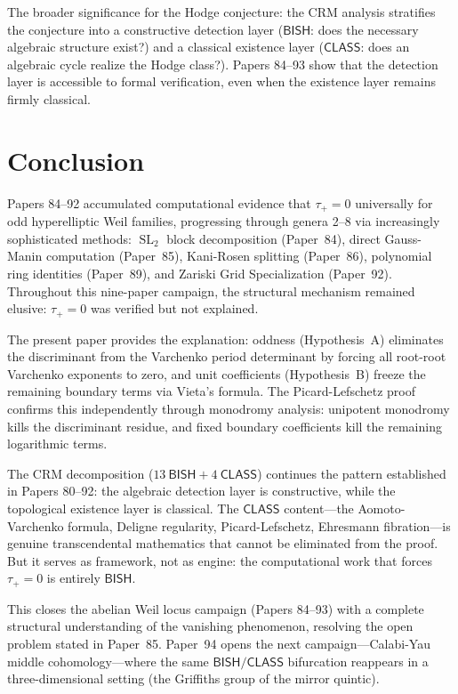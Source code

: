 \documentclass[11pt]{article}
\theoremstyle{plain}
\theoremstyle{definition}
\theoremstyle{remark}
\newcommand{\SL}{\operatorname{SL}}
\newcommand{\BISH}{\mathsf{BISH}}
\newcommand{\CLASS}{\mathsf{CLASS}}
\begin{document}
The broader significance for the Hodge conjecture: the CRM analysis stratifies
the conjecture into a constructive detection layer ($\BISH$: does the necessary
algebraic structure exist?) and a classical existence layer ($\CLASS$: does an
algebraic cycle realize the Hodge class?).  Papers 84--93 show that the
detection layer is accessible to formal verification, even when the existence
layer remains firmly classical.


\section{Conclusion}\label{sec:conclusion}

Papers 84--92 accumulated computational evidence that $\tau_+ = 0$ universally
for odd hyperelliptic Weil families, progressing through genera 2--8 via
increasingly sophisticated methods: $\SL_2$ block decomposition (Paper~84),
direct Gauss-Manin computation (Paper~85), Kani-Rosen splitting (Paper~86),
polynomial ring identities (Paper~89), and Zariski Grid Specialization
(Paper~92).  Throughout this nine-paper campaign, the structural mechanism
remained elusive: $\tau_+ = 0$ was verified but not explained.

The present paper provides the explanation:
oddness (Hypothesis~A) eliminates the discriminant from the Varchenko period
determinant by forcing all root-root Varchenko exponents to zero, and
unit coefficients (Hypothesis~B) freeze the remaining
boundary terms via Vieta's formula.  The Picard-Lefschetz proof confirms
this independently through monodromy analysis: unipotent monodromy kills
the discriminant residue, and fixed boundary coefficients kill the remaining
logarithmic terms.

The CRM decomposition ($13~\BISH + 4~\CLASS$) continues the pattern
established in Papers 80--92: the algebraic detection layer is constructive,
while the topological existence layer is classical.  The $\CLASS$ content---the
Aomoto-Varchenko formula, Deligne regularity, Picard-Lefschetz, Ehresmann
fibration---is genuine transcendental mathematics that cannot be eliminated
from the proof.  But it serves as framework, not as engine: the computational
work that forces $\tau_+ = 0$ is entirely $\BISH$.

This closes the abelian Weil locus campaign (Papers 84--93) with a
complete structural understanding of the vanishing phenomenon, resolving
the open problem stated in Paper~85.
Paper~94 \cite{p94} opens the next campaign---Calabi-Yau middle
cohomology---where the same $\BISH/\CLASS$ bifurcation reappears in a
three-dimensional setting (the Griffiths group of the mirror quintic).
\end{document}
